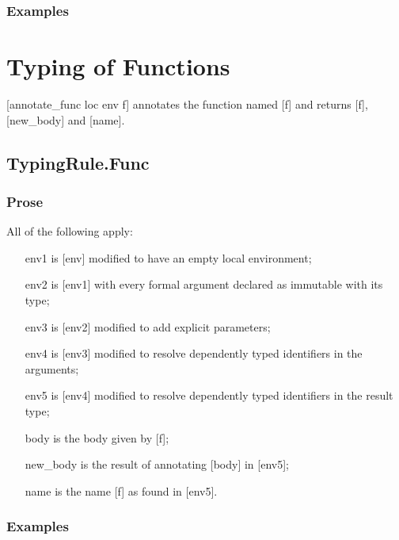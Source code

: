 \documentclass{book}
\begin{document}
    \subsubsection{Examples}

\section{Typing of Functions}
[annotate\_func loc env f] annotates the function named [f] and returns [f],
[new\_body] and [name].

\subsection{TypingRule.Func}

  \subsubsection{Prose}
  All of the following apply:
 \begin{itemize}
 \item [env1] is [env] modified to have an empty local environment;
 \item [env2] is [env1] with every formal argument declared as immutable with its type;
 \item [env3] is [env2] modified to add explicit parameters;
 \item [env4] is [env3] modified to resolve dependently typed identifiers in the arguments;
 \item [env5] is [env4] modified to resolve dependently typed identifiers in the result type;
 \item [body] is the body given by [f];
 \item [new\_body] is the result of annotating [body] in [env5];
 \item [name] is the name [f] as found in [env5].
 \end{itemize} 

  \subsubsection{Examples}
\end{document}
